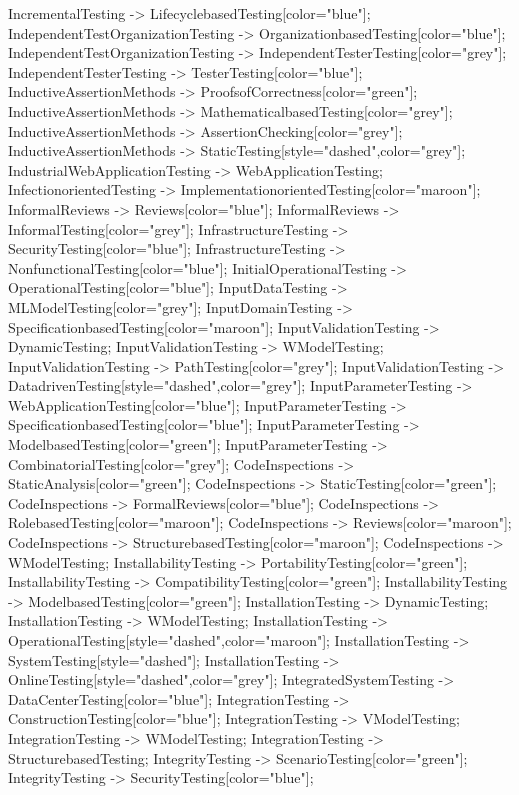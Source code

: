 \documentclass{article}
\begin{document}
{IncrementalTesting -> LifecyclebasedTesting[color="blue"];
IndependentTestOrganizationTesting -> OrganizationbasedTesting[color="blue"];
IndependentTestOrganizationTesting -> IndependentTesterTesting[color="grey"];
IndependentTesterTesting -> TesterTesting[color="blue"];
InductiveAssertionMethods -> ProofsofCorrectness[color="green"];
InductiveAssertionMethods -> MathematicalbasedTesting[color="grey"];
InductiveAssertionMethods -> AssertionChecking[color="grey"];
InductiveAssertionMethods -> StaticTesting[style="dashed",color="grey"];
IndustrialWebApplicationTesting -> WebApplicationTesting;
InfectionorientedTesting -> ImplementationorientedTesting[color="maroon"];
InformalReviews -> Reviews[color="blue"];
InformalReviews -> InformalTesting[color="grey"];
InfrastructureTesting -> SecurityTesting[color="blue"];
InfrastructureTesting -> NonfunctionalTesting[color="blue"];
InitialOperationalTesting -> OperationalTesting[color="blue"];
InputDataTesting -> MLModelTesting[color="grey"];
InputDomainTesting -> SpecificationbasedTesting[color="maroon"];
InputValidationTesting -> DynamicTesting;
InputValidationTesting -> WModelTesting;
InputValidationTesting -> PathTesting[color="grey"];
InputValidationTesting -> DatadrivenTesting[style="dashed",color="grey"];
InputParameterTesting -> WebApplicationTesting[color="blue"];
InputParameterTesting -> SpecificationbasedTesting[color="blue"];
InputParameterTesting -> ModelbasedTesting[color="green"];
InputParameterTesting -> CombinatorialTesting[color="grey"];
CodeInspections -> StaticAnalysis[color="green"];
CodeInspections -> StaticTesting[color="green"];
CodeInspections -> FormalReviews[color="blue"];
CodeInspections -> RolebasedTesting[color="maroon"];
CodeInspections -> Reviews[color="maroon"];
CodeInspections -> StructurebasedTesting[color="maroon"];
CodeInspections -> WModelTesting;
InstallabilityTesting -> PortabilityTesting[color="green"];
InstallabilityTesting -> CompatibilityTesting[color="green"];
InstallabilityTesting -> ModelbasedTesting[color="green"];
InstallationTesting -> DynamicTesting;
InstallationTesting -> WModelTesting;
InstallationTesting -> OperationalTesting[style="dashed",color="maroon"];
InstallationTesting -> SystemTesting[style="dashed"];
InstallationTesting -> OnlineTesting[style="dashed",color="grey"];
IntegratedSystemTesting -> DataCenterTesting[color="blue"];
IntegrationTesting -> ConstructionTesting[color="blue"];
IntegrationTesting -> VModelTesting;
IntegrationTesting -> WModelTesting;
IntegrationTesting -> StructurebasedTesting;
IntegrityTesting -> ScenarioTesting[color="green"];
IntegrityTesting -> SecurityTesting[color="blue"];
}
\end{document}
